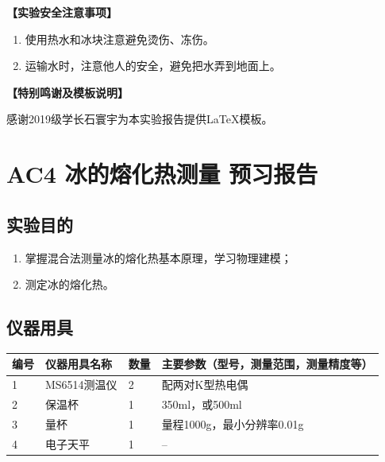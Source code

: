 \documentclass[dvipsnames, svgnames,a4paper,11pt]{article}
\begin{document}
	\textbf{【实验安全注意事项】}	
	\begin{enumerate}
		\item 使用热水和冰块注意避免烫伤、冻伤。
		\item 运输水时，注意他人的安全，避免把水弄到地面上。	
	\end{enumerate}
	
	\textbf{【特别鸣谢及模板说明】}	
	
	感谢2019级学长石寰宇为本实验报告提供\LaTeX 模板。
	
	
	
	\clearpage
	\tableofcontents
	\clearpage
	
	
	
	\setcounter{section}{0}
	\section{AC4 冰的熔化热测量 \quad\heiti 预习报告}
	
	\subsection{实验目的}
	\begin{enumerate}
		\item 掌握混合法测量冰的熔化热基本原理，学习物理建模；
		\item 测定冰的熔化热。
	\end{enumerate}
	
	\subsection{仪器用具}
	\begin{table}[htbp]
		\centering
		\renewcommand\arraystretch{1.6}
		\begin{tabular}{p{}|p{}|p{}|p{}}
			\hline
			编号& 仪器用具名称 & 数量 &  主要参数（型号，测量范围，测量精度等） \\
			\hline
			1& MS6514测温仪 & 2 & 配两对K型热电偶 \\
			
			2& 保温杯 & 1 & 350ml，或500ml \\
			
			3& 量杯 & 1 & 量程1000g，最小分辨率0.01g \\
			
			4& 电子天平 & 1 & -- \\
			\hline
		\end{tabular}
	\end{table}
	
\end{document}
